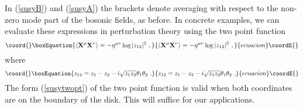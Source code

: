 \documentclass[a4paper,12pt]{article}
\begin{document}
In (\ref{susyB}) and (\ref{susyA})  the brackets \myHighlight{$\langle\cdots\rangle$}\coordHE{} denote
averaging with respect to the non-zero mode part of the bosonic fields, as before.
In concrete examples, we can evaluate these expressions in perturbation theory 
using the two point function \cite{AT}
\begin{equation}\coord{}\boxEquation{
\langle {\bf X}^\mu {\bf X}^\nu \rangle = - \eta^{\mu\nu} \log |z_{12}|^2~,
\label{susytwopt}
}{
\langle {\bf X}^\mu {\bf X}^\nu \rangle = - \eta^{\mu\nu} \log |z_{12}|^2~,
}{ecuacion}\coordE{}\end{equation}
where
\begin{equation}\coord{}\boxEquation{
z_{12} = z_1 - z_2 - i \sqrt{z_1 z_2} \theta_1 \theta_2~. 
}{
z_{12} = z_1 - z_2 - i \sqrt{z_1 z_2} \theta_1 \theta_2~. 
}{ecuacion}\coordE{}\end{equation}
The form (\ref{susytwopt}) of the two point function is valid when both
coordinates are on the boundary of the disk. 
This will suffice for our applications.
\end{document}
